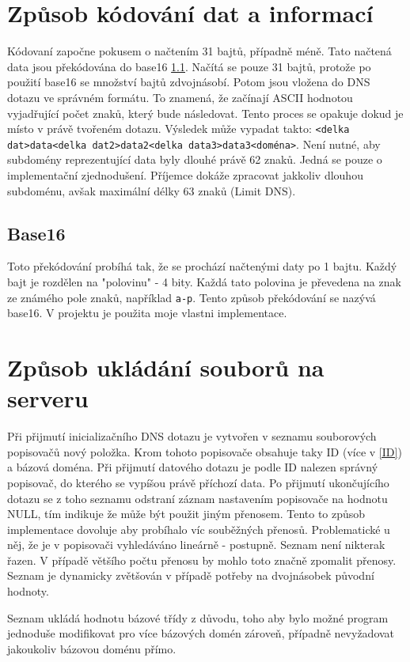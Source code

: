 \documentclass[11pt]{article}
\begin{document}
\section{Způsob kódování dat a informací} \label{kodovani}
Kódovaní započne pokusem o načtením 31 bajtů, případně méně. Tato načtená data jsou překódována do base16 \ref{base16}. Načítá se pouze 31 bajtů, protože po použití base16 se množství bajtů zdvojnásobí. Potom jsou vložena do DNS dotazu ve správném formátu. To znamená, že začínají ASCII hodnotou vyjadřující počet znaků, který bude následovat. Tento proces se opakuje dokud je místo v právě tvořeném dotazu. Výsledek může vypadat takto: \texttt{<delka dat>data<delka dat2>data2<delka data3>data3<doména>}. Není nutné, aby subdomény reprezentující data byly dlouhé právě 62 znaků. Jedná se pouze o implementační zjednodušení. Příjemce dokáže zpracovat jakkoliv dlouhou subdoménu, avšak maximální délky 63 znaků (Limit DNS).

\subsection{Base16} \label{base16}
Toto překódování probíhá tak, že se prochází načtenými daty po 1 bajtu. Každý bajt je rozdělen na "polovinu" - 4 bity. Každá tato polovina je převedena na znak ze známého pole znaků, například \texttt{a-p}. Tento způsob překódování se nazývá base16. V projektu je použita moje vlastni implementace. 

\section{Způsob ukládání souborů na serveru}\label{ukladani}
Při přijmutí inicializačního DNS dotazu je vytvořen v seznamu souborových popisovačů nový položka. Krom tohoto popisovače obsahuje taky ID (více v \ref{ID}) a bázová doména. Při přijmutí datového dotazu je podle ID nalezen správný popisovač, do kterého se vypíšou právě příchozí data. Po přijmutí ukončujícího dotazu se z toho seznamu odstraní záznam nastavením popisovače na hodnotu NULL, tím indikuje že může být použit jiným přenosem. Tento to způsob implementace dovoluje aby probíhalo víc souběžných přenosů. Problematické u něj, že je v popisovači vyhledáváno lineárně - postupně. Seznam není nikterak řazen. V případě většího počtu přenosu by mohlo toto značně zpomalit přenosy. Seznam je dynamicky zvětšován v případě potřeby na dvojnásobek původní hodnoty. 

Seznam ukládá hodnotu bázové třídy z důvodu, toho aby bylo možné program jednoduše modifikovat pro více bázových domén zároveň, případně nevyžadovat jakoukoliv bázovou doménu přímo.
\end{document}
